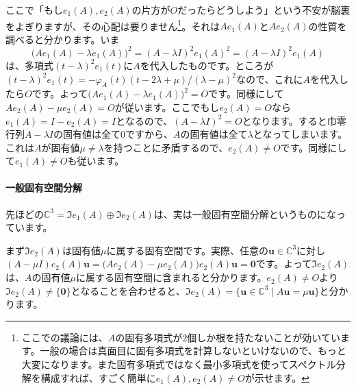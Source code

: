 ここで「もし$e_1(A), e_2(A)$の片方が$O$だったらどうしよう」という不安が脳裏をよぎりますが、その心配は要りません\footnote{ここでの議論には、$A$の固有多項式が$2$個しか根を持たないことが効いています。一般の場合は真面目に固有多項式を計算しないといけないので、もっと大変になります。また固有多項式ではなく最小多項式を使ってスペクトル分解を構成すれば、すごく簡単に$e_1(A), e_2(A) \neq O$が示せます。}。それは$A e_1(A)$と$A e_2(A)$の性質を調べると分かります。いま
\[
\bigl(A e_1(A) - \lambda e_1(A)\bigr)^2 = (A - \lambda I)^2 e_1(A)^2 = (A - \lambda I)^2 e_1(A)
\]
は、多項式$(t - \lambda)^2 e_1(t)$に$A$を代入したものです。ところが$(t - \lambda)^2 e_1(t) = - \varphi_A(t) (t - 2\lambda + \mu)/(\lambda - \mu)^2$なので、これに$A$を代入したら$O$です。よって$\bigl(A e_1(A) - \lambda e_1(A)\bigr)^2 = O$です。同様にして$A e_2(A) - \mu e_2(A) = O$が従います。ここでもし$e_2(A) = O$なら$e_1(A) = I - e_2(A) = I$となるので、$(A - \lambda I)^2 = O$となります。すると巾零行列$A - \lambda I$の固有値は全て$0$ですから、$A$の固有値は全て$\lambda$となってしまいます。これは$A$が固有値$\mu \neq \lambda$を持つことに矛盾するので、$e_2(A) \neq O$です。同様にして$e_1(A) \neq O$も従います。

\paragraph{一般固有空間分解} 先ほどの$\mathbb{C}^3 = \Im e_1(A) \oplus \Im e_2(A)$は、実は一般固有空間分解というものになっています。

まず$\Im e_2(A)$は固有値$\mu$に属する固有空間です。実際、任意の$\bm{u} \in \mathbb{C}^3$に対し$(A - \mu I) e_2(A) \bm{u} = \bigl(A e_2(A) - \mu e_2(A)\bigr) e_2(A) \bm{u} = \bm{0}$です。よって$\Im e_2(A)$は、$A$の固有値$\mu$に属する固有空間に含まれると分かります。$e_2(A) \neq O$より$\Im e_2(A) \neq \{\bm{0}\}$となることを合わせると、$\Im e_2(A) = \{ \bm{u} \in \mathbb{C}^3 \mid A\bm{u} = \mu \bm{u}\}$と分かります。

